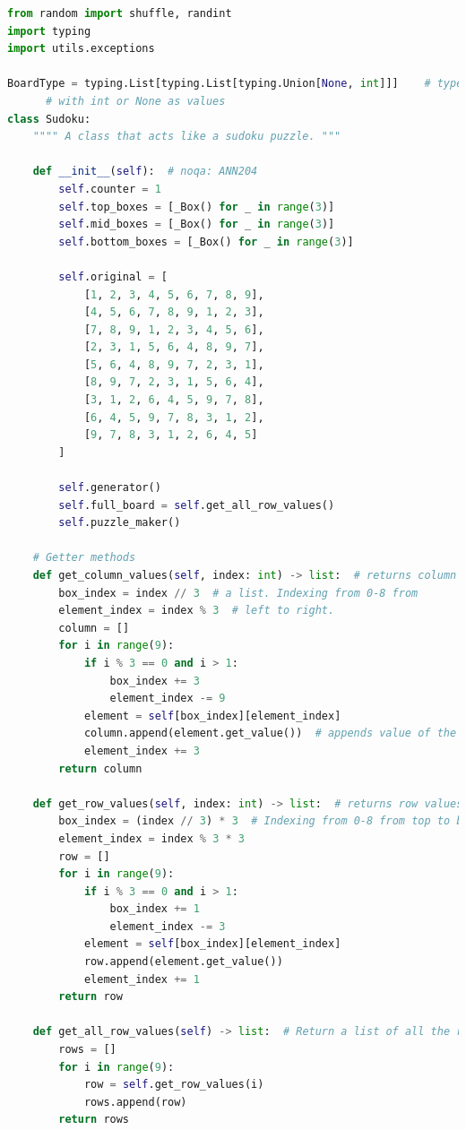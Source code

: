 \documentclass[12pt, a4paper]{report}
\begin{document}
    \begin{lstlisting}[language=Python, caption=utils/classes.py]
from random import shuffle, randint
import typing
import utils.exceptions

BoardType = typing.List[typing.List[typing.Union[None, int]]]    # type hint alias for board - a list of lists
      # with int or None as values
class Sudoku:
    """" A class that acts like a sudoku puzzle. """

    def __init__(self):  # noqa: ANN204
        self.counter = 1
        self.top_boxes = [_Box() for _ in range(3)]
        self.mid_boxes = [_Box() for _ in range(3)]
        self.bottom_boxes = [_Box() for _ in range(3)]

        self.original = [
            [1, 2, 3, 4, 5, 6, 7, 8, 9],
            [4, 5, 6, 7, 8, 9, 1, 2, 3],
            [7, 8, 9, 1, 2, 3, 4, 5, 6],
            [2, 3, 1, 5, 6, 4, 8, 9, 7],
            [5, 6, 4, 8, 9, 7, 2, 3, 1],
            [8, 9, 7, 2, 3, 1, 5, 6, 4],
            [3, 1, 2, 6, 4, 5, 9, 7, 8],
            [6, 4, 5, 9, 7, 8, 3, 1, 2],
            [9, 7, 8, 3, 1, 2, 6, 4, 5]
        ]

        self.generator()
        self.full_board = self.get_all_row_values()
        self.puzzle_maker()

    # Getter methods
    def get_column_values(self, index: int) -> list:  # returns column values in the form of
        box_index = index // 3  # a list. Indexing from 0-8 from
        element_index = index % 3  # left to right.
        column = []
        for i in range(9):
            if i % 3 == 0 and i > 1:
                box_index += 3
                element_index -= 9
            element = self[box_index][element_index]
            column.append(element.get_value())  # appends value of the element.
            element_index += 3
        return column

    def get_row_values(self, index: int) -> list:  # returns row values in the form of a list.
        box_index = (index // 3) * 3  # Indexing from 0-8 from top to bottom
        element_index = index % 3 * 3
        row = []
        for i in range(9):
            if i % 3 == 0 and i > 1:
                box_index += 1
                element_index -= 3
            element = self[box_index][element_index]
            row.append(element.get_value())
            element_index += 1
        return row

    def get_all_row_values(self) -> list:  # Return a list of all the rows.
        rows = []
        for i in range(9):
            row = self.get_row_values(i)
            rows.append(row)
        return rows


\end{lstlisting}
\end{document}
